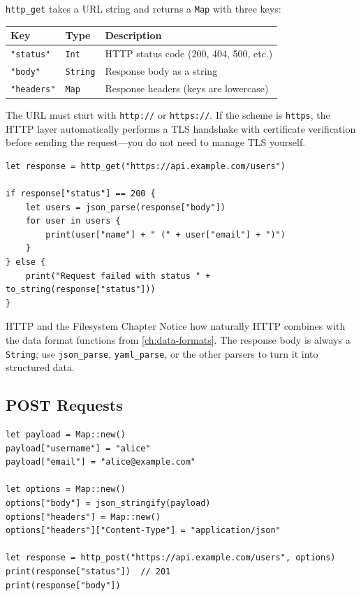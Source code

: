 \lstinline|http_get| takes a URL string and returns a \lstinline|Map| with
three keys:

\begin{center}
\begin{tabular}{llp{7.5cm}}
\toprule
\textbf{Key} & \textbf{Type} & \textbf{Description} \\
\midrule
\lstinline|"status"| & \lstinline|Int| & HTTP status code (200, 404, 500, etc.) \\
\lstinline|"body"| & \lstinline|String| & Response body as a string \\
\lstinline|"headers"| & \lstinline|Map| & Response headers (keys are lowercase) \\
\bottomrule
\end{tabular}
\end{center}

The URL must start with \lstinline|http://| or \lstinline|https://|. If the
scheme is \lstinline|https|, the HTTP layer automatically performs a TLS
handshake with certificate verification before sending the request---you do
not need to manage TLS yourself.

\begin{lstlisting}[language=Lattice, caption={Fetching and parsing JSON from an API}]
let response = http_get("https://api.example.com/users")

if response["status"] == 200 {
    let users = json_parse(response["body"])
    for user in users {
        print(user["name"] + " (" + user["email"] + ")")
    }
} else {
    print("Request failed with status " + to_string(response["status"]))
}
\end{lstlisting}

\begin{notebox}{HTTP and the Filesystem Chapter}
Notice how naturally HTTP combines with the data format functions from
\cref{ch:data-formats}. The response body is always a \lstinline|String|;
use \lstinline|json_parse|, \lstinline|yaml_parse|, or the other parsers to
turn it into structured data.
\end{notebox}

\subsection{POST Requests}\label{sec:http-post}

\begin{lstlisting}[language=Lattice, caption={Sending a POST request with a JSON body}]
let payload = Map::new()
payload["username"] = "alice"
payload["email"] = "alice@example.com"

let options = Map::new()
options["body"] = json_stringify(payload)
options["headers"] = Map::new()
options["headers"]["Content-Type"] = "application/json"

let response = http_post("https://api.example.com/users", options)
print(response["status"])  // 201
print(response["body"])
\end{lstlisting}


